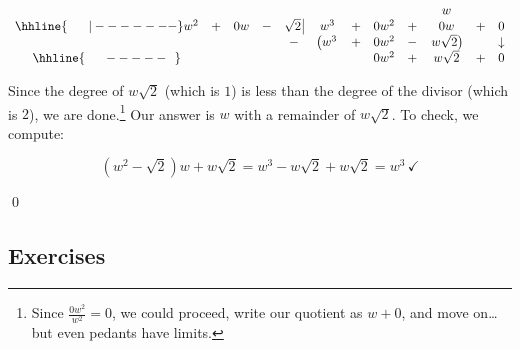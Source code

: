 \documentclass{ximera}
\begin{document}
\begin{ex}
\begin{enumerate}
\setlength\arraycolsep{0.1pt}
\setlength\extrarowheight{2pt}

\[ \begin{array}{cccccccccccc}

    &   &    &   &                    &     &   &      &   &  w &   & \\ \hhline{~~~~~|-------}

w^2 & + & 0w & - & \sqrt{2} \, \vline & w^3 & + & 0w^2 & + & 0w & + & 0  \\
    
		&   &    &    &                  -&\left(w^3\vphantom{w\sqrt{2}} \right. & + & 0w^2 & - & \left.  w\sqrt{2} \right) & & \downarrow \\ \hhline{~~~~~-----~~}
    &   &    &    &                   &                                       &  &  0w^2     &  + &   w\sqrt{2}  & + & 0\\ 
 
\end{array}\]
\setlength\arraycolsep{5pt}
\setlength\extrarowheight{0pt}

Since the degree of $w\sqrt{2}$ (which is $1$) is less than the degree of the divisor (which is $2$), we are done.\footnote{Since $\frac{0w^2}{w^2} = 0$, we could proceed, write our quotient as $w+0$, and move on\ldots but even pedants have limits.}  Our answer is $w$ with a remainder of $w \sqrt{2}$.  To check, we compute:

\[ \left(w^2 - \sqrt{2}\right)w + w\sqrt{2} = w^3 - w\sqrt{2} + w\sqrt{2} = w^3 \, \checkmark\]

\vspace{-0.3in}\qed

\end{enumerate}

\end{ex}

\newpage

\subsection{Exercises}


\closegraphsfile
\end{document}
